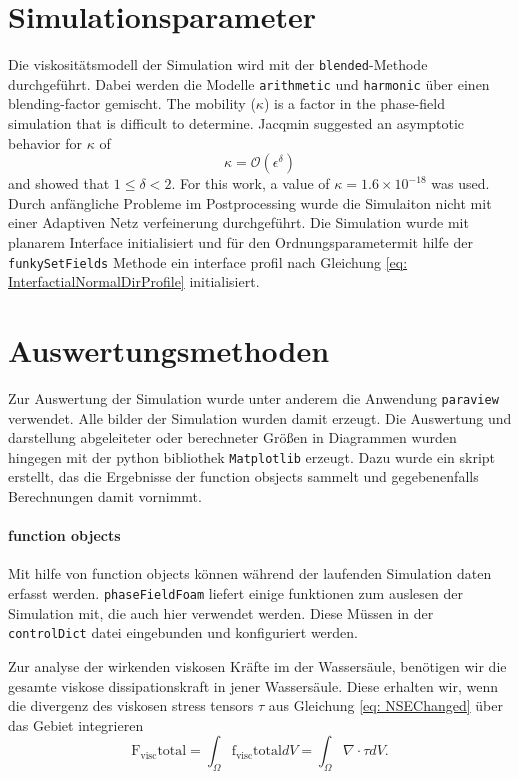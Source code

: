 \section{Simulationsparameter}
Die viskositätsmodell der Simulation wird mit der \texttt{blended}-Methode durchgeführt. Dabei werden die Modelle \texttt{arithmetic} und \texttt{harmonic} über einen blending-factor gemischt. The mobility ($\kappa$) is a factor in the phase-field simulation that is difficult to determine. Jacqmin \cite{jacqmin1999CalculationTwoPhaseNavier} suggested an asymptotic behavior for \( \kappa \) of 
\begin{equation}
    \kappa = \mathcal{O}(\epsilon^{\delta})
\end{equation}
and showed that \( 1 \leq \delta < 2 \). 
For this work, a value of \( \kappa = 1.6 \times 10^{-18} \) was used. Durch anfängliche Probleme im Postprocessing wurde die Simulaiton nicht mit einer Adaptiven Netz verfeinerung durchgeführt. 
Die Simulation wurde mit planarem Interface initialisiert und für den Ordnungsparametermit hilfe der \texttt{funkySetFields} Methode ein interface profil nach Gleichung \ref{eq: InterfactialNormalDirProfile} initialisiert. 



\section{Auswertungsmethoden}
Zur Auswertung der Simulation wurde unter anderem die Anwendung \texttt{paraview} verwendet. Alle bilder der Simulation wurden damit erzeugt. Die Auswertung und darstellung abgeleiteter oder berechneter Größen in Diagrammen wurden hingegen mit der python bibliothek \texttt{Matplotlib} erzeugt. Dazu wurde ein skript erstellt, das die Ergebnisse der function obsjects sammelt und gegebenenfalls Berechnungen damit vornimmt. 
\paragraph{function objects}
Mit hilfe von function objects können während der laufenden Simulation daten erfasst werden. \texttt{phaseFieldFoam} liefert einige funktionen zum auslesen der Simulation mit, die auch hier verwendet werden. Diese Müssen in der \texttt{controlDict} datei eingebunden und konfiguriert werden. 

Zur analyse der wirkenden viskosen Kräfte im der Wassersäule, benötigen wir die gesamte viskose dissipationskraft in jener Wassersäule. Diese erhalten wir, wenn die divergenz des viskosen stress tensors $\tau$ aus Gleichung \ref{eq: NSEChanged} über das Gebiet integrieren
\begin{equation}
    \mathrm{F}_{\mathrm{visc}}{\mathrm{total}} = \int_{\Omega} \mathrm{f}_{\mathrm{visc}}{\mathrm{total}} dV = \int_{\Omega} \nabla \cdot \tau dV.
\end{equation}